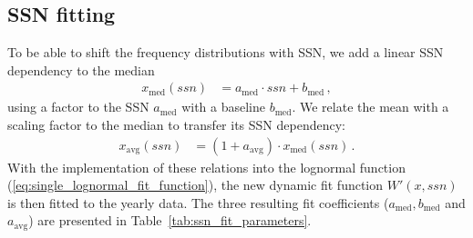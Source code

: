 \subsection{SSN fitting}
\label{sec:ssn_fitting}
To be able to shift the frequency distributions with SSN, we add a linear SSN dependency to the median
\begin{align}
	x_\text{med}(ssn) &= a_\text{med} \cdot ssn + b_\text{med}\,,	\label{eq:median_with_ssn}
\end{align}
using a factor to the SSN $a_\text{med}$ with a baseline $b_\text{med}$. We relate the mean with a scaling factor to the median to transfer its SSN dependency:
\begin{align}
	x_\text{avg}(ssn) &= (1 + a_\text{avg}) \cdot x_\text{med}(ssn)\,.	\label{eq:mean_with_ssn}
\end{align}
With the implementation of these relations into the lognormal function (\ref{eq:single_lognormal_fit_function}), the new dynamic fit function $W'(x,ssn)$ is then fitted to the yearly data. The three resulting fit coefficients ($a_\text{med}, b_\text{med}$ and $a_\text{avg}$) are presented in Table~\ref{tab:ssn_fit_parameters}.
